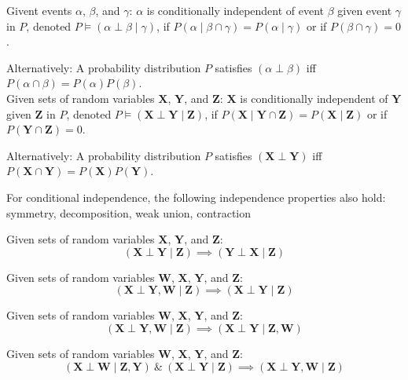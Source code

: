 {%
  Givent events $\alpha$, $\beta$, and $\gamma$: $\alpha$ is conditionally independent of event $\beta$ given event $\gamma$ in $P$, denoted $P\models(\alpha\perp\beta\mid\gamma)$, if $P(\alpha\mid\beta\cap\gamma)=P(\alpha\mid\gamma)$ or if $P(\beta\cap\gamma)=0$.

  Alternatively: A \gls{probability distribution} $P$ satisfies $(\alpha\perp\beta)$ \acrshort{iff} $P(\alpha\cap\beta)=P(\alpha)P(\beta)$.\\[0.1cm]

  Given sets of random variables $\bm{X}$, $\bm{Y}$, and $\bm{Z}$: $\bm{X}$ is conditionally independent of $\bm{Y}$ given $\bm{Z}$ in $P$, denoted $P\models(\bm{X}\perp\bm{Y}\mid\bm{Z})$, if $P(\bm{X}\mid\bm{Y}\cap\bm{Z})=P(\bm{X}\mid\bm{Z})$ or if $P(\bm{Y}\cap\bm{Z})=0$.

  Alternatively: A \gls{probability distribution} $P$ satisfies $(\bm{X}\perp\bm{Y})$ \acrshort{iff} $P(\bm{X}\cap\bm{Y})=P(\bm{X})P(\bm{Y})$.

  For conditional independence, the following independence properties also hold: \gls{symmetry}, \gls{decomposition}, \gls{weak union}, \gls{contraction}
}

{%
  Given sets of random variables $\bm{X}$, $\bm{Y}$, and $\bm{Z}$:
  \begin{equation*}
    (\bm{X}\perp\bm{Y}\mid\bm{Z})\implies(\bm{Y}\perp\bm{X}\mid\bm{Z})
  \end{equation*}
}

{%
  Given sets of random variables $\bm{W}$, $\bm{X}$, $\bm{Y}$, and $\bm{Z}$:
  \begin{equation*}
    (\bm{X}\perp\bm{Y},\bm{W}\mid\bm{Z})\implies(\bm{X}\perp\bm{Y}\mid\bm{Z})
  \end{equation*}
}

{%
  Given sets of random variables $\bm{W}$, $\bm{X}$, $\bm{Y}$, and $\bm{Z}$:
  \begin{equation*}
    (\bm{X}\perp\bm{Y},\bm{W}\mid \bm{Z})\implies(\bm{X}\perp\bm{Y}\mid\bm{Z},\bm{W})
  \end{equation*}
}

{%
  Given sets of random variables $\bm{W}$, $\bm{X}$, $\bm{Y}$, and $\bm{Z}$:
  \begin{equation*}
    (\bm{X}\perp\bm{W}\mid\bm{Z},\bm{Y})~\&~(\bm{X}\perp\bm{Y}\mid\bm{Z})\implies(\bm{X}\perp\bm{Y},\bm{W}\mid\bm{Z})
  \end{equation*}
}

